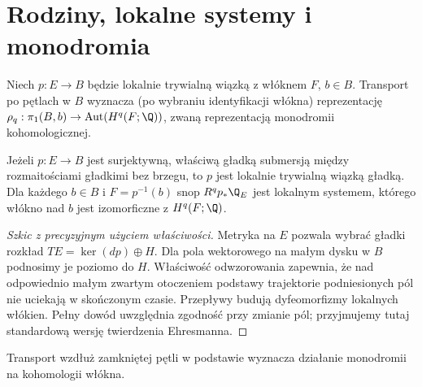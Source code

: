 \section{Rodziny, lokalne systemy i monodromia}
\begin{definicja}
Niech $p:E\to B$ będzie lokalnie trywialną wiązką
z włóknem $F$, $b\in B$. Transport po pętlach
w $B$ wyznacza (po wybraniu identyfikacji włókna)
reprezentację
$\rho_q:\pi_1(B,b)\to\operatorname{Aut}(H^q(F;\Q))$,
zwaną reprezentacją monodromii kohomologicznej.
\end{definicja}
\begin{twierdzenie}
Jeżeli $p:E\to B$ jest surjektywną, właściwą gładką
submersją między rozmaitościami gładkimi bez brzegu,
to $p$ jest lokalnie trywialną wiązką gładką.
Dla każdego $b\in B$ i $F=p^{-1}(b)$
snop $R^qp_*\Q_E$ jest lokalnym systemem,
którego włókno nad $b$ jest izomorficzne
z $H^q(F;\Q)$.
\end{twierdzenie}
\begin{proof}[Szkic z precyzyjnym użyciem właściwości]
Metryka na $E$ pozwala wybrać gładki rozkład
$TE=\ker(dp)\oplus H$. Dla pola wektorowego
na małym dysku w $B$ podnosimy je poziomo do $H$.
Właściwość odwzorowania zapewnia, że nad odpowiednio
małym zwartym otoczeniem podstawy trajektorie
podniesionych pól nie uciekają w skończonym czasie.
Przepływy budują dyfeomorfizmy lokalnych włókien.
Pełny dowód uwzględnia zgodność przy zmianie pól;
przyjmujemy tutaj standardową wersję twierdzenia
Ehresmanna.
\end{proof}

\begin{center}
\par\medskip\small Transport wzdłuż zamkniętej pętli w podstawie
wyznacza działanie monodromii na kohomologii włókna.
\end{center}

